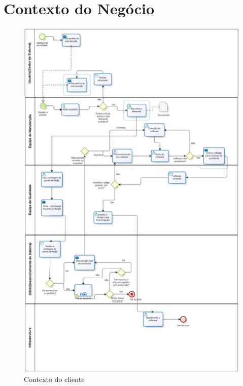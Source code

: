 \chapter[Contexto do Negócio]{Contexto do Negócio}\label{apendice:contexto}

\begin{figure}[H]
	\centering
	\includegraphics[keepaspectratio=true,scale=0.7]{figuras/contexto.eps}
	\caption{Contexto do cliente}
	\label{}
\end{figure}
